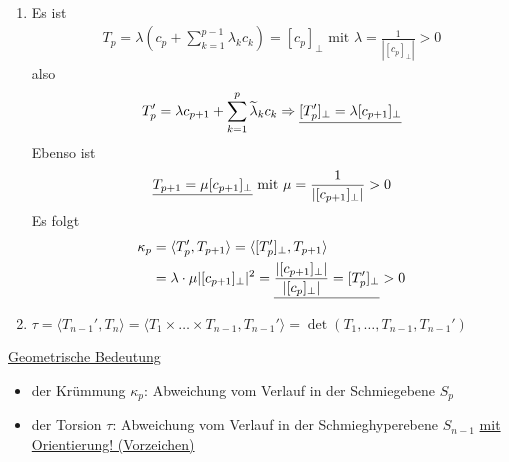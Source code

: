 \begin{beweis} \(\)
 \begin{enumerate}
  \item Es ist 
  \begin{align*}
  T_p = \lambda \left(c_p + \sum_{k=1}^{p-1} \lambda_k c_k\right) = [c_p]_\perp \text{ mit } \lambda = \frac{1}{|[c_p]_\perp|} > 0
  \end{align*}
  also
  \[
   T_p' = \lambda c_{p+1} + \sum_{k=1}^p \widetilde{\lambda}_k c_k \Rightarrow \uline{[T_p']_\perp = \lambda [c_{p+1}]_\perp}
  \]
  Ebenso ist
  \[
   \uline{T_{p+1} = \mu [c_{p+1}]_\perp} \text{ mit } \mu = \frac{1}{|[c_{p+1}]_\perp|} > 0
  \]
  Es folgt
  \begin{align*}
   \kappa_p &= \langle T_p', T_{p+1} \rangle = \langle [T_p']_\perp, T_{p+1}\rangle \\
   &= \lambda \cdot \mu |[c_{p+1}]_\perp |^2 = \uline{\frac{|[c_{p+1}]_\perp|}{|[c_p]_\perp|} = [T_p']_\perp} > 0
  \end{align*}
  \item \(\tau = \langle T_{n-1}', T_n \rangle = \langle T_1 \times \dots \times T_{n-1}, T_{n-1}' \rangle = \det ( T_1, \dots, T_{n-1}, T_{n-1}')\)
 \end{enumerate}

\end{beweis}

\uline{Geometrische Bedeutung}
 \begin{itemize}
  \item der Krümmung \(\kappa_p\): Abweichung vom Verlauf in der Schmiegebene \(S_p\)
  \item der Torsion \(\tau\): Abweichung vom Verlauf in der Schmieghyperebene \(S_{n-1}\) \uline{mit Orientierung! (Vorzeichen)} 
 \end{itemize}

